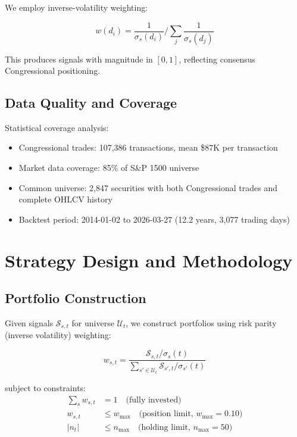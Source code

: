 \documentclass[twocolumn,ieee]{Base_Latex_Template/arithmaxresearch}
\begin{document}
We employ inverse-volatility weighting:

$$w(d_i) = \frac{1}{\sigma_s(d_i)} / \sum_{j} \frac{1}{\sigma_s(d_j)}$$

This produces signals with magnitude in $[0, 1]$, reflecting consensus Congressional positioning.

\subsection{Data Quality and Coverage}

Statistical coverage analysis:
\begin{itemize}
\item Congressional trades: 107,386 transactions, mean \$87K per transaction
\item Market data coverage: 85\% of S\&P 1500 universe
\item Common universe: 2,847 securities with both Congressional trades and complete OHLCV history
\item Backtest period: 2014-01-02 to 2026-03-27 (12.2 years, 3,077 trading days)
\end{itemize}

\section{Strategy Design and Methodology}

\subsection{Portfolio Construction}

Given signals $\mathcal{S}_{s,t}$ for universe $\mathcal{U}_t$, we construct portfolios using risk parity (inverse volatility) weighting:

$$w_{s,t} = \frac{\mathcal{S}_{s,t} / \sigma_s(t)}{\sum_{s' \in \mathcal{U}_t} \mathcal{S}_{s',t} / \sigma_{s'}(t)}$$

subject to constraints:
\begin{align}
\sum_s w_{s,t} &= 1 \quad \text{(fully invested)} \\
w_{s,t} &\leq w_{\max} \quad \text{(position limit, } w_{\max} = 0.10 \text{)} \\
|n_t| &\leq n_{\max} \quad \text{(holding limit, } n_{\max} = 50 \text{)}
\end{align}
\end{document}
